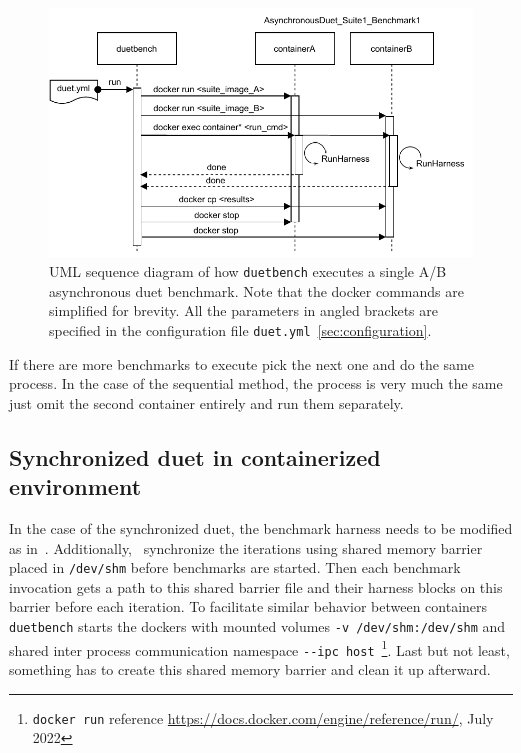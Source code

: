 \begin{figure}
	\centering
	\includegraphics[width=\linewidth]{./figures/duetbench-sequence.drawio.pdf}
	\caption{
        UML sequence diagram of how \lstinline{duetbench} executes a single A/B asynchronous duet benchmark.
        Note that the docker commands are simplified for brevity.
        All the parameters in angled brackets are specified in the configuration file \lstinline{duet.yml}~\cref{sec:configuration}.
	}
	\label{fig:duetbench_sequence}
\end{figure}

If there are more benchmarks to execute pick the next one and do the same process.
In the case of the sequential method, the process is very much the same just omit the second container entirely and run them separately.

\subsection{Synchronized duet in containerized environment}

In the case of the synchronized duet, the benchmark harness needs to be modified as in~\citet{bulej2020duet}.
Additionally,~\citet{bulej2020duet} synchronize the iterations using shared memory barrier placed in \lstinline{/dev/shm} before benchmarks are started.
Then each benchmark invocation gets a path to this shared barrier file and their harness blocks on this barrier before each iteration.
To facilitate similar behavior between containers \lstinline{duetbench} starts the dockers with mounted volumes \lstinline{-v /dev/shm:/dev/shm} and shared inter process communication namespace \lstinline{--ipc host}~\footnote{\lstinline{docker run} reference \url{https://docs.docker.com/engine/reference/run/}, July 2022}.
Last but not least, something has to create this shared memory barrier and clean it up afterward.

